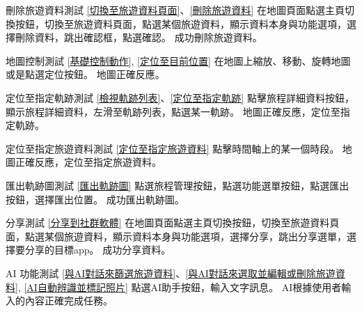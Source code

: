 \addtestcase
  {刪除旅遊資料測試}
  {}
  {\ref{切換至旅遊資料頁面}、\ref{刪除旅遊資料}}
  {在地圖頁面點選主頁切換按鈕，切換至旅遊資料頁面，點選某個旅遊資料，顯示資料本身與功能選項，選擇刪除資料，跳出確認框，點選確認。}
  {成功刪除旅遊資料。}

\addtestcase
  {地圖控制測試}
  {}
  {\ref{基礎控制動作}, \ref{定位至目前位置}}
  {在地圖上縮放、移動、旋轉地圖或是點選定位按鈕。}
  {地圖正確反應。}

\addtestcase
  {定位至指定軌跡測試}
  {}
  {\ref{檢視軌跡列表}、\ref{定位至指定軌跡}}
  {點擊旅程詳細資料按鈕，顯示旅程詳細資料，左滑至軌跡列表，點選某一軌跡。}
  {地圖正確反應，定位至指定軌跡。}

\addtestcase
  {定位至指定旅遊資料測試}
  {}
  {\ref{定位至指定旅遊資料}}
  {點擊時間軸上的某一個時段。}
  {地圖正確反應，定位至指定旅遊資料。}

\addtestcase
  {匯出軌跡圖測試}
  {}
  {\ref{匯出軌跡圖}}
  {點選旅程管理按鈕，點選功能選單按鈕，點選匯出按鈕，選擇匯出位置。}
  {成功匯出軌跡圖。}

\addtestcase
  {分享測試}
  {}
  {\ref{分享到社群軟體}}
  {在地圖頁面點選主頁切換按鈕，切換至旅遊資料頁面，點選某個旅遊資料，顯示資料本身與功能選項，選擇分享，跳出分享選單，選擇要分享的目標app。}
  {成功分享資料。}

\addtestcase
  {AI 功能測試}
  {}
  {\ref{與AI對話來篩選旅遊資料}、\ref{與AI對話來選取並編輯或刪除旅遊資料}, \ref{AI自動辨識並標記照片}}
  {點選AI助手按鈕，輸入文字訊息。}
  {AI根據使用者輸入的內容正確完成任務。}

\testcaseTable
